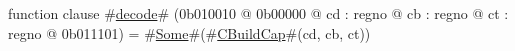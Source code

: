function clause #\hyperref[zdecode]{decode}# (0b010010 @ 0b00000 @ cd : regno @ cb : regno @ ct : regno @ 0b011101) = #\hyperref[zSome]{Some}#(#\hyperref[zCBuildCap]{CBuildCap}#(cd, cb, ct))
